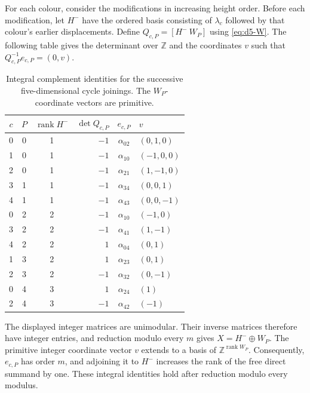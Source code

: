 \documentclass[11pt,reqno]{amsart}
\numberwithin{equation}{section}
\theoremstyle{definition}
\theoremstyle{remark}
\newcommand{\Z}{\mathbb Z}
\begin{document}
For each colour, consider the modifications in increasing height order.
Before each modification, let $H^-$ have the ordered basis consisting of
$\lambda_c$ followed by that colour's earlier displacements. Define $Q_{c,P}=[H^-\ W_P]$ using
\eqref{eq:d5-W}. The following table gives the determinant over $\Z$ and the
coordinates $v$ such that $Q_{c,P}^{-1}e_{c,P}=(0,v)$.
\begin{table}[htbp]
\centering\small
\caption{Integral complement identities for the successive five-dimensional cycle joinings.
The $W_P$-coordinate vectors are primitive.}\label{tab:d5-integral}
\begin{tabular}{cccrcl}
\toprule
$c$&$P$&$\operatorname{rank}H^-$&$\det Q_{c,P}$&$e_{c,P}$&$v$\\\midrule
0&0&1&$-1$&$\alpha_{02}$&$(0,1,0)$\\
1&0&1&$-1$&$\alpha_{10}$&$(-1,0,0)$\\
2&0&1&$-1$&$\alpha_{21}$&$(1,-1,0)$\\
3&1&1&$-1$&$\alpha_{34}$&$(0,0,1)$\\
4&1&1&$-1$&$\alpha_{43}$&$(0,0,-1)$\\
0&2&2&$-1$&$\alpha_{10}$&$(-1,0)$\\
3&2&2&$-1$&$\alpha_{41}$&$(1,-1)$\\
4&2&2&$1$&$\alpha_{04}$&$(0,1)$\\
1&3&2&$1$&$\alpha_{23}$&$(0,1)$\\
2&3&2&$-1$&$\alpha_{32}$&$(0,-1)$\\
0&4&3&$1$&$\alpha_{24}$&$(1)$\\
2&4&3&$-1$&$\alpha_{42}$&$(-1)$\\\bottomrule
\end{tabular}
\end{table}
The displayed integer matrices are unimodular. Their inverse matrices therefore
have integer entries, and reduction modulo every $m$ gives
$X=H^-\oplus W_P$. The primitive integer coordinate vector $v$ extends to a basis of
$\Z^{\operatorname{rank}W_P}$. Consequently, $e_{c,P}$ has order $m$, and
adjoining it to $H^-$ increases the rank of the free direct summand by one. These integral identities hold after reduction modulo every modulus.
\end{document}
